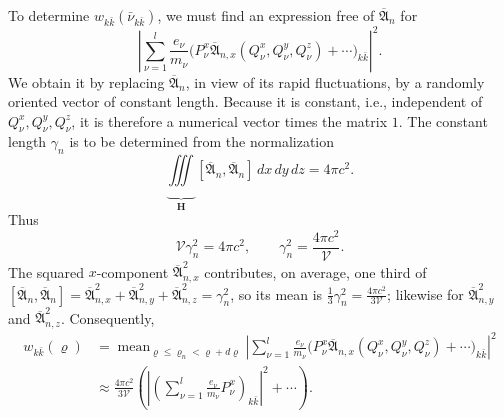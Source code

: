 \documentclass[fontsize=13pt,twoside,openany,headings=normal,parskip=false,bookmarkpackage=false,DIV=calc]{scrbook}
\begin{document}
To determine $w_{k\bar k}(\bar\nu_{k\bar k})$, we must find an expression free of $\overline{\mathfrak A}_n$ for
\[
 \left|\sum_{\nu=1}^{l}\frac{e_\nu}{m_\nu}
 \bigl(P_\nu^x\overline{\mathfrak A}_{n,x}(Q_\nu^x,Q_\nu^y,Q_\nu^z)+\cdots\bigr)_{k\bar k}\right|^2.
\]
We obtain it by replacing $\overline{\mathfrak A}_n$, in view of its rapid fluctuations, by a randomly oriented vector of constant length. Because it is constant, i.e., independent of $Q_\nu^x,Q_\nu^y,Q_\nu^z$, it is therefore a numerical vector times the matrix $1$. The constant length $\gamma_n$ is to be determined from the normalization
\[
 \underbrace{\iiint}_{\boldsymbol H}[\overline{\mathfrak A}_n,\overline{\mathfrak A}_n]\,dx\,dy\,dz=4\pi c^2.
\]
Thus
\[
 \mathcal V\gamma_n^2=4\pi c^2,\qquad \gamma_n^2=\frac{4\pi c^2}{\mathcal V}.
\]
The squared $x$-component $\overline{\mathfrak A}_{n,x}^{2}$ contributes, on average, one third of $[\overline{\mathfrak A}_n,\overline{\mathfrak A}_n]=\overline{\mathfrak A}_{n,x}^{2}+\overline{\mathfrak A}_{n,y}^{2}+\overline{\mathfrak A}_{n,z}^{2}=\gamma_n^2$, so its mean is $\frac13\gamma_n^2=\frac{4\pi c^2}{3\mathcal V}$; likewise for $\overline{\mathfrak A}_{n,y}^{2}$ and $\overline{\mathfrak A}_{n,z}^{2}$. Consequently,
\begin{align*}
 w_{k\bar k}(\varrho)
 &=\mathop{\operatorname{mean}}_{\varrho\le\varrho_n<\varrho+d\varrho}
 \left|\sum_{\nu=1}^{l}\frac{e_\nu}{m_\nu}
 \bigl(P_\nu^x\overline{\mathfrak A}_{n,x}(Q_\nu^x,Q_\nu^y,Q_\nu^z)+\cdots\bigr)_{k\bar k}\right|^2\\
 &\approx\frac{4\pi c^2}{3\mathcal V}
 \left(\left|\left(\sum_{\nu=1}^{l}\frac{e_\nu}{m_\nu}P_\nu^x\right)_{k\bar k}\right|^2+\cdots\right).
\end{align*}
\end{document}
